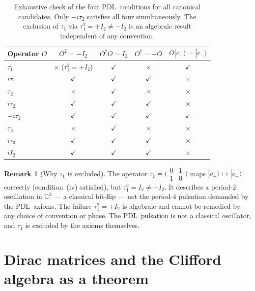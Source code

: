 \documentclass[11pt,a4paper]{article}
\theoremstyle{definition}
\newtheorem{remark}[theorem]{Remark}
\newcommand{\PDL}{\textnormal{PDL}}
\newcommand{\cplu}{|c_+\rangle}
\newcommand{\cmin}{|c_-\rangle}
\begin{document}
\begin{table}[ht]
\centering
\caption{Exhaustive check of the four \PDL\ conditions for all canonical candidates. Only $-i\tau_2$ satisfies all four simultaneously. The exclusion of $\tau_1$ via $\tau_1^2 = +I_2 \neq -I_2$ is an algebraic result independent of any convention.}
\label{tab:candidates}
\begin{tabular}{lcccc}
\toprule
Operator $O$ & $O^2 = -I_2$ & $O^\dagger O = I_2$ & $O^\dagger = -O$ & $O\cplu = \cmin$ \\
\midrule
$\tau_1$ & $\times$ \;($\tau_1^2 = +I_2$) & $\checkmark$ & $\times$ & $\checkmark$ \\
$i\tau_1$ & $\checkmark$ & $\checkmark$ & $\checkmark$ & $\times$ \\
$\tau_2$ & $\times$ & $\checkmark$ & $\times$ & $\times$ \\
$i\tau_2$ & $\checkmark$ & $\checkmark$ & $\checkmark$ & $\times$ \\
$-i\tau_2$ & $\checkmark$ & $\checkmark$ & $\checkmark$ & $\checkmark$ \\
$\tau_3$ & $\times$ & $\checkmark$ & $\times$ & $\times$ \\
$i\tau_3$ & $\checkmark$ & $\checkmark$ & $\checkmark$ & $\times$ \\
$iI_2$ & $\checkmark$ & $\checkmark$ & $\checkmark$ & $\times$ \\
\bottomrule
\end{tabular}
\end{table}

\begin{remark}[Why $\tau_1$ is excluded]
The operator $\tau_1 = \bigl(\begin{smallmatrix}0&1\\1&0\end{smallmatrix}\bigr)$ maps $\cplu \mapsto \cmin$ correctly (condition~(iv) satisfied), but $\tau_1^2 = I_2 \neq -I_2$. It describes a period-2 oscillation in $\mathbb{C}^2$ --- a classical bit-flip --- not the period-4 pulsation demanded by the \PDL\ axioms. The failure $\tau_1^2 = +I_2$ is algebraic and cannot be remedied by any choice of convention or phase. The \PDL\ pulsation is not a classical oscillator, and $\tau_1$ is excluded by the axioms themselves.
\end{remark}

\section{Dirac matrices and the Clifford algebra as a theorem}
\label{sec:dirac}
\end{document}
